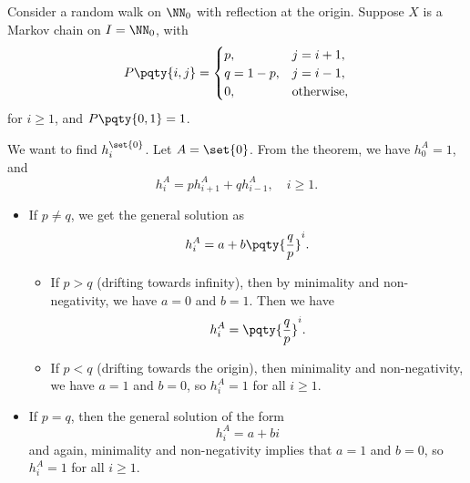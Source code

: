 \begin{example}
    \label{ex:random-walk-hitting-probability}%
    Consider a random walk on \(\NN_0\) with reflection at the origin. Suppose \(X\) is a Markov chain on \(I = \NN_0\), with
    \[
        P\pqty{i, j} = \begin{cases}
            p, & j = i + 1, \\
            q = 1 - p, & j = i - 1, \\
            0, & \text{otherwise},
        \end{cases}
    \]
    for \(i \geq 1\), and \(P\pqty{0, 1} = 1\).

    We want to find \(h_i^{\set{0}}\). Let \(A = \set{0}\). From the theorem, we have \(h_0^A = 1\), and
    \[
        h_i^A = p h_{i + 1}^{A} + q h_{i - 1}^A, \quad i \geq 1.
    \]  

    \begin{itemize}
        \item If \(p \neq q\), we get the general solution as
        \[
            h_i^A = a + b \pqty{\frac{q}{p}}^i.
        \]

        \begin{itemize}
            \item If \(p > q\) (drifting towards infinity), then by minimality and non-negativity, we have \(a = 0\) and \(b = 1\). Then we have
            \[
                h_i^{A} = \pqty{\frac{q}{p}}^i.
            \]

            \item If \(p < q\) (drifting towards the origin), then minimality and non-negativity, we have \(a = 1\) and \(b = 0\), so \(h_i^A = 1\) for all \(i \geq 1\).
        \end{itemize}

        \item If \(p = q\), then the general solution of the form
        \[
            h_i^A = a + bi
        \]
        and again, minimality and non-negativity implies that \(a = 1\) and \(b = 0\), so \(h_i^A = 1\) for all \(i \geq 1\).
    \end{itemize}
\end{example}

